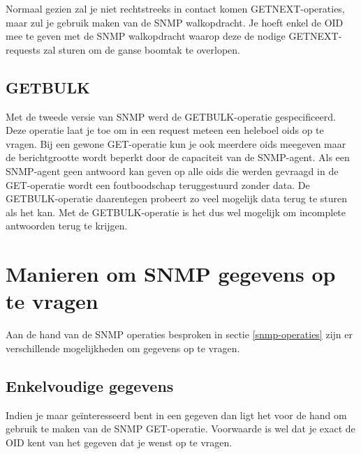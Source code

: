 Normaal gezien zal je niet rechtstreeks in contact komen GETNEXT-operaties, maar zul je gebruik maken van de SNMP walkopdracht.
Je hoeft enkel de OID mee te geven met de SNMP walkopdracht waarop deze de nodige GETNEXT-requests zal sturen om de ganse boomtak te overlopen.



\subsection{GETBULK}
Met de tweede versie van SNMP werd de GETBULK-operatie gespecificeerd.
Deze operatie laat je toe om in een request meteen een heleboel \glspl{oid} op te vragen.
Bij een gewone GET-operatie kun je ook meerdere \glspl{oid} meegeven maar de berichtgrootte wordt beperkt door de capaciteit van de SNMP-agent.
Als een SNMP-agent geen antwoord kan geven op alle \glspl{oid} die werden gevraagd in de GET-operatie wordt een foutboodschap teruggestuurd zonder data.
De GETBULK-operatie daarentegen probeert zo veel mogelijk data terug te sturen als het kan.
Met de GETBULK-operatie is het dus wel mogelijk om incomplete antwoorden terug te krijgen.\cite{essentialsnmp}

\section{Manieren om SNMP gegevens op te vragen}

Aan de hand van de SNMP operaties besproken in sectie \ref{snmp-operaties} zijn er
verschillende mogelijkheden om gegevens op te vragen.

\subsection{Enkelvoudige gegevens}

Indien je maar geïnteresseerd bent in een gegeven dan ligt het voor de hand om gebruik te maken van de SNMP GET-operatie.
Voorwaarde is wel dat je exact de OID kent van het gegeven dat je wenst op te vragen.





